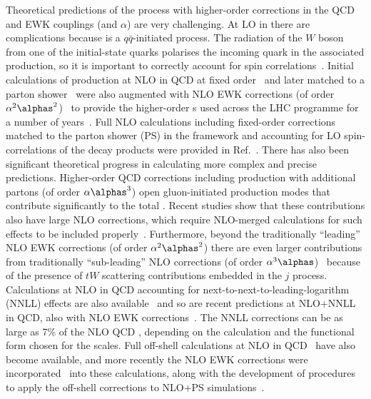 \documentclass[cernpreprint, atlasdraft=false, texlive=2023, UKenglish, texmf, orcidlogo]{atlasdoc}
\begin{document}
Theoretical predictions of the \ttW process with higher-order
corrections in the QCD and EWK couplings (\alphas and $\alpha$) are very
challenging. At LO in \alphas there are complications because
\ttW is a $q\bar{q}$-initiated process. The radiation of
the $W$ boson from one of the initial-state quarks polarises the
incoming quark in the associated \ttbar production, so it is important to correctly account for spin
correlations~\cite{Maltoni:2014zpa}.
Initial calculations of \ttW production at
NLO in QCD at fixed order~\cite{Campbell:2012dh} and later
matched to a parton shower~\cite{Garzelli:2012bn,Maltoni:2015ena} were
also augmented with NLO EWK corrections (of order
$\alpha^2\alphas^2$)~\cite{Frixione:2015zaa} to provide the
higher-order \xs{}s used across the LHC programme for a number of
years~\cite{YR4}. Full NLO calculations including
fixed-order corrections matched to the parton shower (PS) in the \POWHEGBOX
framework and accounting for LO spin-correlations of the decay products
were provided in Ref.~\cite{FebresCordero:2021kcc}.
There has also been significant theoretical progress in
calculating more complex and precise predictions. Higher-order QCD
corrections including \ttW production with additional partons (of order
$\alpha\alphas^3$) open gluon-initiated production modes that
contribute significantly to the total \xs. Recent studies show that these
contributions also have large NLO corrections, which require NLO-merged
calculations for such effects to be included properly~\cite{Frederix:2021agh}.
Furthermore, beyond the traditionally \enquote{leading} NLO EWK corrections
(of order $\alpha^2\alphas^2$) there are even larger contributions from
traditionally \enquote{sub-leading} NLO corrections (of order
$\alpha^3\alphas$)~\cite{Dror:2015nkp,Frederix:2017wme,FebresCordero:2021kcc}
because of the presence of $tW$ scattering contributions embedded in
the \ttW{}$j$ process.
Calculations at NLO in QCD accounting for next-to-next-to-leading-logarithm
(NNLL) effects are also available~\cite{Kulesza:2018tqz}
and so are recent predictions at NLO+NNLL in QCD, also with NLO EWK
corrections~\cite{Broggio:2019ewu,Kulesza:2020nfh}.
The NNLL corrections can be as large as 7\% of the NLO QCD \xs,
depending on the calculation and the functional form chosen for the scales.
Full off-shell calculations at NLO in
QCD~\cite{Bevilacqua:2020pzy,Denner:2020hgg,Bevilacqua:2020srb} have
also become available, and more recently the NLO EWK corrections were
incorporated~\cite{Denner:2021hqi} into these calculations, along
with the development of procedures to apply the off-shell corrections
to NLO+PS simulations~\cite{Bevilacqua:2021tzp}.
 
\end{document}
